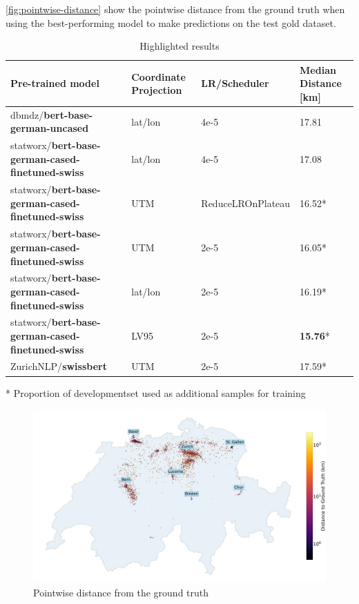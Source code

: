 \autoref{fig:pointwise-distance} show the pointwise distance from the ground truth when using the best-performing model to make predictions on the test gold dataset.

\begin{table}
    \centering
    \begin{tabular}{p{}|p{}|p{}|p{}}
        \toprule
        Pre-trained model                                        & Coordinate Projection & LR/Scheduler      & Median Distance [km] \\
        \midrule
        dbmdz/\textbf{bert-base-german-uncased}                  & lat/lon               & 4e-5              & 17.81                \\
        statworx/\textbf{bert-base-german-cased-finetuned-swiss} & lat/lon               & 4e-5              & 17.08                \\
        statworx/\textbf{bert-base-german-cased-finetuned-swiss} & UTM                   & ReduceLROnPlateau & 16.52*               \\
        statworx/\textbf{bert-base-german-cased-finetuned-swiss} & UTM                   & 2e-5              & 16.05*               \\
        statworx/\textbf{bert-base-german-cased-finetuned-swiss} & lat/lon               & 2e-5              & 16.19*               \\
        statworx/\textbf{bert-base-german-cased-finetuned-swiss} & LV95                  & 2e-5              & \textbf{15.76}*      \\
        ZurichNLP/\textbf{swissbert}                             & UTM                   & 2e-5              & 17.59*               \\
        \bottomrule
    \end{tabular}
    \caption{Highlighted results}
    \bigskip
    \raggedright
    * Proportion of developmentset used as additional samples for training \\
    \label{tbl:highlighted-results}
\end{table}

\begin{figure}
    \centering
    \includegraphics[width=\textwidth]{./figs/dotmap.png}
    \caption{Pointwise distance from the ground truth}
    \label{fig:pointwise-distance}
\end{figure}

